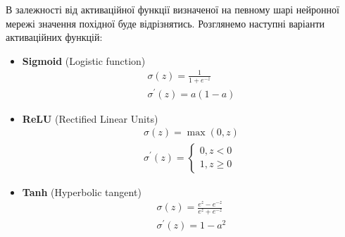 \documentclass[14pt,a4paper]{extarticle}
\newcounter{e}
\numberwithin{equation}{section}
\numberwithin{figure}{section}
\begin{document}
	В залежності від активаційної функції визначеної на певному шарі нейронної мережі значення похідної буде відрізнятись. Розглянемо наступні варіанти активаційних функцій:
	\begin{itemize}	
		\item \textbf{Sigmoid} (Logistic function)
		\label{sigmoid}
		\begin{equation}
			\begin{array}{l}
				\displaystyle
				\sigma(z)=\frac{1}{1+e^{-z}} \\[0.5cm]

				\displaystyle
				\sigma^{\prime}(z)=a(1-a)
			\end{array}
		\end{equation}
		
		\item \textbf{ReLU} (Rectiﬁed Linear Units)
		\begin{equation}
			\label{relu}
			\begin{array}{l}
				\displaystyle
				\sigma(z)=\max (0, z) \\[0.5cm]

				\displaystyle
				\sigma^{\prime}(z)=\left\{\begin{array}{l}
					0, z<0 \\
					1, z \geq 0
				\end{array}\right.
			\end{array}
		\end{equation}
		
		\item \textbf{Tanh} (Hyperbolic tangent)
		\begin{equation}
			\label{tanh}
			\begin{array}{l}
				\displaystyle
				\sigma(z)=\frac{e^{z}-e^{-z}}{e^{z}+e^{-z}} \\[0.5cm]

				\displaystyle
				\sigma^{\prime}(z)=1-a^{2}
			\end{array}
		\end{equation}
	\end{itemize}
	

\end{document}
